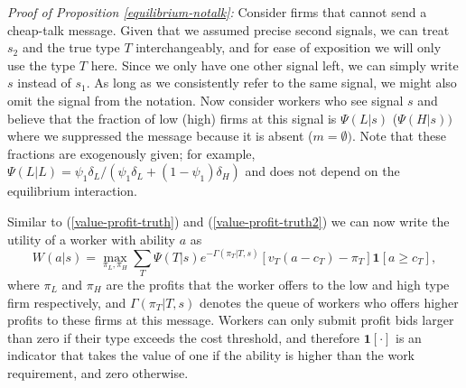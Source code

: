 \documentclass[12pt]{article}
\begin{document}
\bigskip \bigskip

\noindent \textit{Proof of Proposition \ref{equilibrium-notalk}:} Consider firms that
cannot send a cheap-talk message. Given that we assumed precise second
signals, we can treat $s_{2}$ and the true type $T$ interchangeably, and for
ease of exposition we will only use the type $T$ here. Since we only have
one other signal left, we can simply write $s$ instead of $s_{1}.$ As long
as we consistently refer to the same signal, we might also omit the signal
from the notation. Now consider workers who see signal $s$ and believe that
the fraction of low (high) firms at this signal is $\Psi (L|s)$ ($\Psi
(H|s)) $ where we suppressed the message because it is absent ($m=\emptyset
).$ Note that these fractions are exogenously given; for example, $\Psi
(L|L)=\psi _{1}\delta _{L}/(\psi _{1}\delta _{L}+(1-\psi _{1})\delta _{H})$
and does not depend on the equilibrium interaction.

Similar to (\ref{value-profit-truth}) and (\ref{value-profit-truth2}) we can
now write the utility of a worker with ability $a$ as%
\begin{equation}
W(a|s)=\max_{\pi _{L},\pi _{H}}\sum_{T}\Psi (T|s)e^{-\Gamma (\pi _{T}|T,s)} 
\left[ v_{T}(a-c_{T})-\pi _{T}\right] \boldsymbol{1}[a\geq c_{T}],
\label{objective-babbling}
\end{equation}%
where $\pi _{L}$ and $\pi _{H}$ are the profits that the worker offers to
the low and high type firm respectively, and $\Gamma (\pi _{T}|T,s)$ denotes
the queue of workers who offers higher profits to these firms at this
message. Workers can only submit profit bids larger than zero if their type
exceeds the cost threshold, and therefore $\boldsymbol{1[\cdot ]}$ is an
indicator that takes the value of one if the ability is higher than the work
requirement, and zero otherwise.
\end{document}
